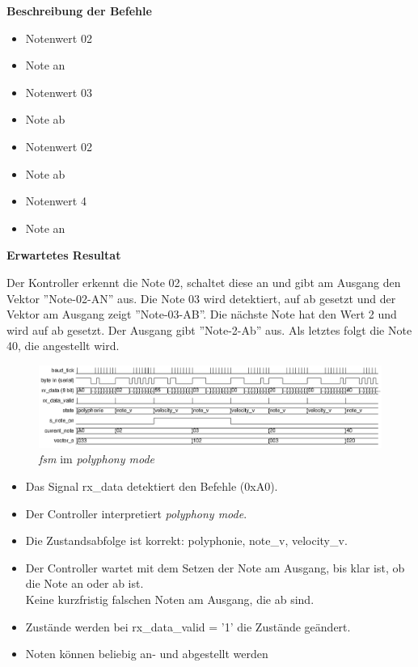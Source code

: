 \textbf{Beschreibung der Befehle}

\begin{itemize}
\item Notenwert 02
\item Note an
\item Notenwert 03
\item Note ab
\item Notenwert 02
\item Note ab
\item Notenwert 4
\item Note an
\end{itemize}

\textbf{Erwartetes Resultat}

Der Kontroller erkennt die Note 02, schaltet diese an und gibt am Ausgang den Vektor ''Note-02-AN'' aus. Die Note 03 wird detektiert, auf ab gesetzt und der Vektor am Ausgang zeigt ''Note-03-AB''. Die nächste Note hat den Wert 2 und wird auf ab gesetzt. Der Ausgang gibt ''Note-2-Ab'' aus. Als letztes folgt die Note 40, die angestellt wird.

\begin{figure}[H]
	\includegraphics[width=1\textwidth]{images/midi_control/wave_polyphonie.png}
	\caption{\textit{fsm} im \textit{polyphony mode}}
	\label{fig.midicontrol_polyphonie}
\end{figure}

\begin{itemize}
	\item Das Signal rx\_data detektiert den Befehle (0xA0).
	\item Der Controller interpretiert  \textit{polyphony mode}. 
	\item Die Zustandsabfolge ist korrekt: polyphonie, note\_v, velocity\_v.
	\item Der Controller wartet mit dem Setzen der Note am Ausgang, bis klar ist, ob die Note an oder ab ist.\\
	Keine kurzfristig falschen Noten am Ausgang, die ab sind.
	\item Zustände werden bei rx\_data\_valid = '1' die Zustände geändert.
	\item Noten können beliebig an- und abgestellt werden
\end{itemize}

